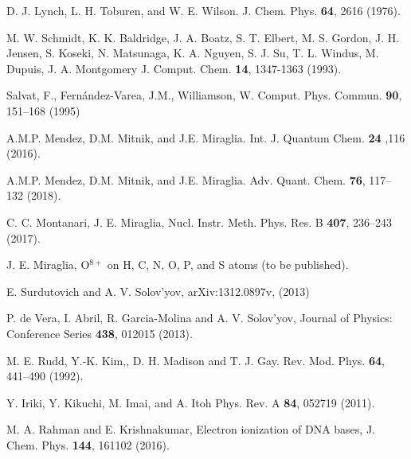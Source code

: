 \documentclass[10pt,showpacs,showkeys,twocolumn]{revtex4}
\begin{document}
\begin{thebibliography}{}
D. J. Lynch, L. H. Toburen, and W. E. Wilson. 
J. Chem. Phys. \textbf{64}, 2616 (1976).

M. W. Schmidt, K. K. Baldridge, J. A. Boatz, S. T. Elbert, M. S. Gordon, 
J. H. Jensen, S. Koseki, N. Matsunaga, K. A. Nguyen, S. J. Su, T. L. Windus, 
M. Dupuis, J. A. Montgomery 
J. Comput. Chem. \textbf{14}, 1347-1363 (1993).

Salvat, F., Fern\'andez-Varea, J.M., Williamson, W.
Comput. Phys. Commun. \textbf{90}, 151--168 (1995)

A.M.P. Mendez, D.M. Mitnik, and J.E. Miraglia.
Int. J. Quantum Chem. \textbf{24} ,116 (2016).

A.M.P. Mendez, D.M. Mitnik, and J.E. Miraglia. 
Adv. Quant. Chem. \textbf{76}, 117--132 (2018).

C. C. Montanari, J. E. Miraglia,
Nucl. Instr. Meth. Phys. Res. B \textbf{407}, 236--243 (2017).

J. E. Miraglia,
O$^{8+}$ on H, C, N, O, P, and S atoms (to be published).

E. Surdutovich and A. V. Solov'yov, 
arXiv:1312.0897v, (2013)

P. de Vera, I. Abril, R. Garcia-Molina and A. V. Solov'yov,
Journal of Physics: Conference Series \textbf{438}, 012015 (2013).

M. E. Rudd, Y.-K. Kim,, D. H. Madison and T. J. Gay.
Rev. Mod. Phys. \textbf{64}, 441--490 (1992).

Y. Iriki, Y. Kikuchi, M. Imai, and A. Itoh
Phys. Rev. A \textbf{84}, 052719 (2011).

M. A. Rahman and E. Krishnakumar,
Electron ionization of DNA bases,
J. Chem. Phys. \textbf{144}, 161102 (2016).


\end{thebibliography}
\end{document}
